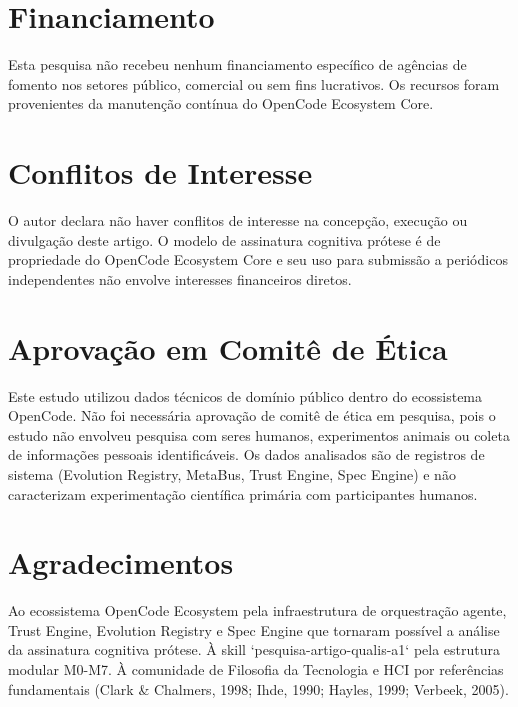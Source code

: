 \documentclass[12pt,a4paper]{article}
\begin{document}
\section*{Financiamento}

Esta pesquisa não recebeu nenhum financiamento específico de agências de fomento nos setores público, comercial ou sem fins lucrativos. Os recursos foram provenientes da manutenção contínua do OpenCode Ecosystem Core.

\section*{Conflitos de Interesse}

O autor declara não haver conflitos de interesse na concepção, execução ou divulgação deste artigo. O modelo de assinatura cognitiva prótese é de propriedade do OpenCode Ecosystem Core e seu uso para submissão a periódicos independentes não envolve interesses financeiros diretos.

\section*{Aprovação em Comitê de Ética}

Este estudo utilizou dados técnicos de domínio público dentro do ecossistema OpenCode. Não foi necessária aprovação de comitê de ética em pesquisa, pois o estudo não envolveu pesquisa com seres humanos, experimentos animais ou coleta de informações pessoais identificáveis. Os dados analisados são de registros de sistema (Evolution Registry, MetaBus, Trust Engine, Spec Engine) e não caracterizam experimentação científica primária com participantes humanos.

\section*{Agradecimentos}

Ao ecossistema OpenCode Ecosystem pela infraestrutura de orquestração agente, Trust Engine, Evolution Registry e Spec Engine que tornaram possível a análise da assinatura cognitiva prótese. À skill `pesquisa-artigo-qualis-a1` pela estrutura modular M0-M7. À comunidade de Filosofia da Tecnologia e HCI por referências fundamentais (Clark & Chalmers, 1998; Ihde, 1990; Hayles, 1999; Verbeek, 2005).

\end{document}
